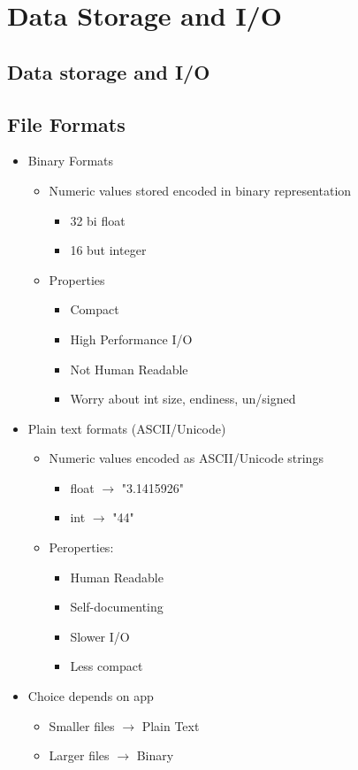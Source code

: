 \documentclass[a4paper]{article}
\begin{document}
\section{Data Storage and I/O}
\subsection{Data storage and I/O}
\subsection{File Formats}
\begin{itemize}
	\item Binary Formats
	\begin{itemize}
		\item Numeric values stored encoded in binary representation
		\begin{itemize}
			\item 32 bi float
			\item 16 but integer
		\end{itemize}
		\item Properties
		\begin{itemize}
			\item Compact
			\item High Performance I/O
			\item Not Human Readable
			\item Worry about int size, endiness, un/signed
		\end{itemize}
	\end{itemize}
	\item Plain text formats (ASCII/Unicode)
	\begin{itemize}
		\item Numeric values encoded as ASCII/Unicode strings
		\begin{itemize}
			\item float $\to$ "3.1415926"
			\item int $\to $ "44"
		\end{itemize}
	\item Peroperties:
		\begin{itemize}
			\item Human Readable
			\item Self-documenting
			\item Slower I/O
			\item Less compact
		\end{itemize}
	\end{itemize}
	\item Choice depends on app
	\begin{itemize}
		\item Smaller files $\to $ Plain Text
		\item Larger files $\to $ Binary
	\end{itemize}
\end{itemize}
\end{document}
